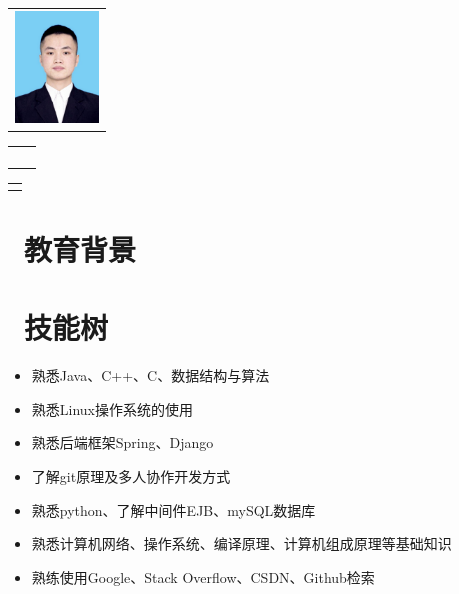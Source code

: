 \documentclass[14pt]{resume}
\begin{document}

\begin{multicols}{4}
    \Large{
        \begin{tabu}{ r }
        \end{tabu}
    }
    \columnbreak
    \Large{
        \begin{tabu}{ l l }
            &  \\
            &  \\
            &  \\
            &  
        \end{tabu}
    }
    \columnbreak
    \Large{
        \begin{tabu}{ r }
        \end{tabu}
    }
\end{multicols}
\vspace{0.5cm}
\section{\faGraduationCap\  教育背景}
\vspace{0.2cm}

\section{\faCogs\ 技能树}

\begin{itemize}
    \item[\faTree] 熟悉Java、C++、C、数据结构与算法
    \item[\faTree] 熟悉Linux操作系统的使用
    \item[\faTree] 熟悉后端框架Spring、Django
    \item[\faTree] 了解git原理及多人协作开发方式
    \item[\faTree] 熟悉python、了解中间件EJB、mySQL数据库
    \item[\faTree] 熟悉计算机网络、操作系统、编译原理、计算机组成原理等基础知识
    \item[\faTree] 熟练使用Google、Stack Overflow、CSDN、Github检索
\end{itemize}
\end{document}
